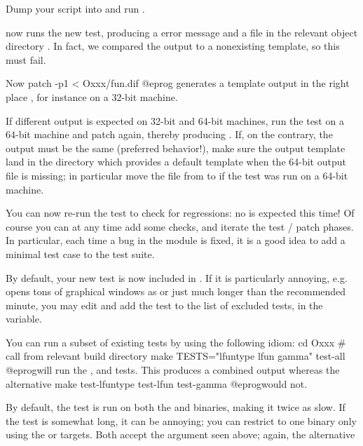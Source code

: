 {\item Dump your script into  and run .

\item {} now runs the new test, producing a \kbd{[BUG]} error
message and a  file in the relevant object directory .
In fact, we compared the output to a nonexisting template, so this must fail.

\item Now
\bprog
  patch -p1 < Oxxx/fun.dif
@eprog\noindent
generates a template output in the right place , for
instance on a 32-bit machine.

\item If different output is expected on 32-bit and 64-bit machines, run the
test on a 64-bit machine and patch again, thereby
producing . If, on the contrary, the output must be the
same (preferred behavior!), make sure the output template land in the
 directory which provides a default template when the
64-bit output file is missing; in particular move the file from
 to  if the test was run on a 64-bit
machine.

\item You can now re-run the test to check for regressions: no \kbd{[BUG]}
is expected this time! Of course you can at any time add some checks, and
iterate the test / patch phases. In particular, each time a bug in the
 module is fixed, it is a good idea to add a minimal test case to
the test suite.

\item By default, your new test is now included in . If
it is particularly annoying, e.g. opens tons of graphical windows as
 or just much longer than the recommended minute, you
may edit  and add the  test to the list of
excluded tests, in the  variable.

\item You can run a subset of existing tests by using the following idiom:
\bprog
  cd Oxxx     # call from relevant build directory
  make TESTS="lfuntype lfun gamma" test-all
@eprog\noindent will run the ,  and  tests.
This produces a combined output whereas the alternative
\bprog
  make test-lfuntype test-lfun test-gamma
@eprog\noindent would not.

\item By default, the test is run on both the  and 
binaries, making it twice as slow. If the test is somewhat long, it can
be annoying; you can restrict to one binary only using the 
or  targets. Both accept the  argument seen
above; again, the alternative

}
